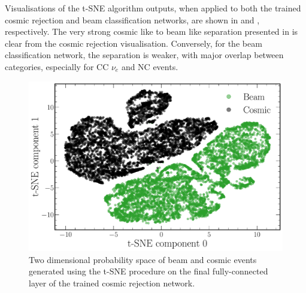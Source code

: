 Visualisations of the t-SNE algorithm outputs, when applied to both the trained cosmic rejection
and beam classification networks, are shown in  and
, respectively. The very strong cosmic like to beam like
separation presented in  is clear from the cosmic rejection
visualisation. Conversely, for the beam classification network, the separation is weaker, with
major overlap between categories, especially for CC $\nu_{e}$ and NC events.

\begin{figure} %
    \includegraphics[width=\textwidth]{diagrams/7-results/explain_cosmic_tsne.pdf}
    \caption[Cosmic rejection network output t-SNE space]
    {Two dimensional probability space of beam and cosmic events generated using the t-SNE
        procedure on the final fully-connected layer of the trained cosmic rejection network.}
    \label{fig:explain_cosmic_tsne}
\end{figure}

